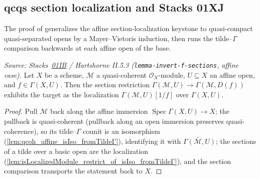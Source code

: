\subsection{qcqs section localization and Stacks 01XJ}
\label{sec:quot_qcqs_section_localization}

The proof of  generalizes the affine
section-localization keystone to quasi-compact quasi-separated opens by a
Mayer--Vietoris induction, then runs the tilde--$\Gamma$ comparison backwards
at each affine open of the base.

\begin{lemma}
  \label{lem:qcoh_section_localization_basicOpen}
  \leanok
  \textit{Source: Stacks~\href{https://stacks.math.columbia.edu/tag/01IB}{01IB}
  / Hartshorne II.5.3 (\texttt{lemma-invert-f-sections}, affine case).}
  Let $X$ be a scheme, $\mathcal{M}$ a quasi-coherent
  $\mathcal{O}_X$-module, $U \subseteq X$ an affine open, and
  $f \in \Gamma(X, U)$. Then the section restriction
  $\Gamma(\mathcal{M}, U) \to \Gamma(\mathcal{M}, D(f))$ exhibits the target as
  the localization $\Gamma(\mathcal{M}, U)[1/f]$ over $\Gamma(X, U)$.
\end{lemma}
\begin{proof}
  \leanok
  Pull $\mathcal{M}$ back along the affine immersion
  $\operatorname{Spec} \Gamma(X, U) \to X$; the pullback is quasi-coherent
  (pullback along an open immersion preserves quasi-coherence), so its
  tilde--$\Gamma$ counit is an isomorphism
  (\cref{lem:qcoh_affine_isIso_fromTildeΓ}), identifying it with
  $\widetilde{\Gamma(\mathcal{M}, U)}$; the sections of a tilde over a basic
  open are the localization
  (\cref{lem:isLocalizedModule_restrict_of_isIso_fromTildeΓ}), and the
  section comparison transports the statement back to $X$.
\end{proof}

